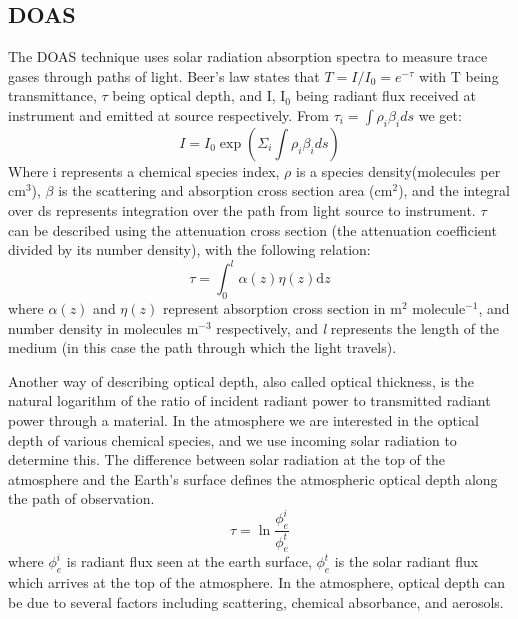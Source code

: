   \subsection{DOAS}
    \label{Model:Meas:DOAS}
  
    The DOAS technique uses solar radiation absorption spectra to measure trace gases through paths of light.
    Beer's law states that $ T = I/I_0 = e^{-\tau} $ with T being transmittance, $\tau$ being optical depth, and I, I$_0$ being radiant flux received at instrument and emitted at source respectively.
    From $ \tau_i = \int \rho_i \beta_i ds $ we get:
    $$ I = I_0 \exp {\left( \Sigma_i \int \rho_i \beta_i ds \right) } $$
    Where i represents a chemical species index, $\rho$ is a species density(molecules per cm$^3$), $\beta$ is the scattering and absorption cross section area (cm$^2$), and the integral over ds represents integration over the path from light source to instrument.
    $\tau$ can be described using the attenuation cross section (the attenuation coefficient divided by its number density), with the following relation:
    \begin{equation*}
      \tau = \int_0^l \alpha(z)\eta(z)\mathrm{d}z
    \end{equation*}
    where $\alpha(z)$ and $\eta(z)$ represent absorption cross section in m$^2$ molecule$^{-1}$, and number density in molecules m$^{-3}$ respectively, and \textit{l} represents the length of the medium (in this case the path through which the light travels). 
    
    Another way of describing optical depth, also called optical thickness, is the natural logarithm of the ratio of incident radiant power to transmitted radiant power through a material.
    In the atmosphere we are interested in the optical depth of various chemical species, and we use incoming solar radiation to determine this.
    The difference between solar radiation at the top of the atmosphere and the Earth's surface defines the atmospheric optical depth along the path of observation.
    \begin{equation*}
      \tau = \ln{\frac{\phi_e^i}{\phi_e^t}}
    \end{equation*}
    where $\phi_e^i$ is radiant flux seen at the earth surface, $\phi_e^t$ is the solar radiant flux which arrives at the top of the atmosphere.
    In the atmosphere, optical depth can be due to several factors including scattering, chemical absorbance, and aerosols.
    

